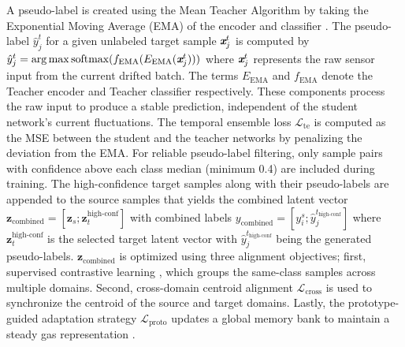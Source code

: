 \documentclass{IEEE_lsens}
\begin{document}
A pseudo-label is created using the Mean Teacher Algorithm by taking the Exponential Moving Average (EMA) of the encoder and classifier \cite{tarvainen2017mean}. The pseudo-label $\hat{y}^t_j$ for a given unlabeled target sample $\textit{\textbf{x}}^t_j$ is computed by $\hat{y}^t_j = \arg\max \text{softmax}(f_{\text{EMA}}(E_{\text{EMA}}(\textit{\textbf{x}}^t_j)))$ where $\textit{\textbf{x}}^t_j$ represents the raw sensor input from the current drifted batch. The terms $E_{\text{EMA}}$ and $f_{\text{EMA}}$ denote the Teacher encoder and Teacher classifier respectively. These components process the raw input to produce a stable prediction, independent of the student network's current fluctuations. The temporal ensemble loss $\mathcal{L}_{\text{te}}$ is computed as the MSE between the student and the teacher networks by penalizing the deviation from the EMA.
For reliable pseudo-label filtering, only sample pairs with confidence above each class median (minimum 0.4) are included during training. The high-confidence target samples along with their pseudo-labels are appended to the source samples that yields the combined latent vector $\textbf{z}_{\text{combined}} = [\textbf{z}_s; \textbf{z}_t^{\text{high-conf}}]$ with combined labels $y_{\text{combined}} = [y^s_i; \hat{y}_j^{t_\text{high-conf}}]$
where $\textbf{z}_t^{\text{high-conf}}$ is the selected target latent vector with  $\hat{y}_j^{t_\text{high-conf}}$ being the generated pseudo-labels.
$\textbf{z}_{\text{combined}}$ is optimized using three alignment objectives;
first, supervised contrastive learning \cite{khosla2020supervised}, which groups the same-class samples across multiple domains. Second, cross-domain centroid alignment $\mathcal{L}_{\text{cross}}$ is used to synchronize the centroid of the source and target domains. Lastly, the prototype-guided adaptation strategy $\mathcal{L}_{\text{proto}}$ updates a global memory bank to maintain a steady gas representation \cite{du2023prototype}.
\end{document}
